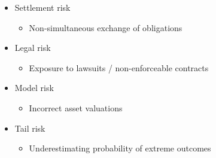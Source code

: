 \documentclass[../notes_compiled.tex]{subfiles}
\begin{document}
\begin{itemize}
\begin{multicols}{2}
\begin{itemize}
\begin{itemize}
\end{itemize}
\item Settlement risk
\begin{itemize}
\item Non-simultaneous exchange of obligations
\end{itemize}
\item Legal risk
\begin{itemize}
\item Exposure to lawsuits / non-enforceable contracts
\end{itemize}
\item Model risk
\begin{itemize}
\item Incorrect asset valuations
\end{itemize}
\item Tail risk
\begin{itemize}
\item Underestimating probability of extreme outcomes
\end{itemize}
\end{itemize}
\end{multicols}
\end{itemize}
\end{document}
